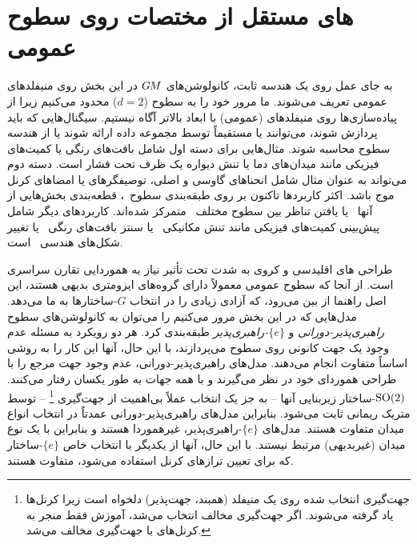 

\section{های مستقل از مختصات روی سطوح عمومی}
\label{sec:instantiations_mesh}


به جای عمل روی یک هندسه ثابت، کانولوشن‌های $G\mkern-1.4muM$ در این بخش روی منیفلدهای عمومی تعریف می‌شوند.
ما مرور خود را به سطوح ($d=2$) محدود می‌کنیم زیرا از پیاده‌سازی‌ها روی منیفلدهای (عمومی) با ابعاد بالاتر آگاه نیستیم.
سیگنال‌هایی که باید پردازش شوند، می‌توانند یا مستقیماً توسط مجموعه داده ارائه شوند یا از هندسه سطوح محاسبه شوند.
مثال‌هایی برای دسته اول شامل بافت‌های رنگی یا کمیت‌های فیزیکی مانند میدان‌های دما یا تنش دیواره یک ظرف تحت فشار است.
دسته دوم می‌تواند به عنوان مثال شامل انحناهای گاوسی و اصلی، توصیفگرهای  یا امضاهای کرنل موج باشد.
اکثر کاربردها تاکنون بر روی طبقه‌بندی سطوح~\cite{huang2019texturenet,jin2018learning,Wiersma2020}، قطعه‌بندی بخش‌هایی از آنها~\cite{poulenard2018multi,huang2019texturenet,Wiersma2020,Yang2020parallelFrameCNN} یا یافتن تناظر بین سطوح مختلف~\cite{masci2015geodesic,boscaini2016learning,schonsheck2018parallel,Wiersma2020,deHaan2020meshCNNs} متمرکز شده‌اند.
کاربردهای دیگر شامل پیش‌بینی کمیت‌های فیزیکی مانند تنش مکانیکی~\cite{sun2018zernet} یا سنتز بافت‌های رنگی~\cite{turk2001texture,ying2001texture} یا تغییر شکل‌های هندسی~\cite{hertz2020GeomTextureSynthesis} است.


طراحی های اقلیدسی و کروی به شدت تحت تأثیر نیاز به هموردایی تقارن سراسری است.
از آنجا که سطوح عمومی معمولاً دارای گروه‌های ایزومتری بدیهی هستند، این اصل راهنما از بین می‌رود، که آزادی زیادی را در انتخاب $G$-ساختارها به ما می‌دهد.
مدل‌هایی که در این بخش مرور می‌کنیم را می‌توان به کانولوشن‌های سطوح \emph{راهبری‌پذیر-دورانی} و \emph{$\{e\}$-راهبری‌پذیر} طبقه‌بندی کرد.
هر دو رویکرد به مسئله عدم وجود یک جهت کانونی روی سطوح می‌پردازند، با این حال، آنها این کار را به روشی اساساً متفاوت انجام می‌دهند.
مدل‌های راهبری‌پذیر-دورانی، عدم وجود جهت مرجع را با طراحی هموردای خود در نظر می‌گیرند و با همه جهات به طور یکسان رفتار می‌کنند.
$\operatorname{SO}(2)$-ساختار زیربنایی آنها -- به جز یک انتخاب عملاً بی‌اهمیت از جهت‌گیری%
\footnote{
	جهت‌گیری انتخاب شده روی یک منیفلد (همبند، جهت‌پذیر) دلخواه است زیرا کرنل‌ها یاد گرفته می‌شوند.
	اگر جهت‌گیری مخالف انتخاب می‌شد، آموزش فقط منجر به کرنل‌های با جهت‌گیری مخالف می‌شد.
}
-- توسط متریک ریمانی ثابت می‌شود.
بنابراین مدل‌های راهبری‌پذیر-دورانی عمدتاً در انتخاب انواع میدان متفاوت هستند.
مدل‌های $\{e\}$-راهبری‌پذیر، غیرهموردا هستند و بنابراین با یک نوع میدان (غیربدیهی) مرتبط نیستند.
با این حال، آنها از یکدیگر با انتخاب خاص $\{e\}$-ساختار که برای تعیین ترازهای کرنل استفاده می‌شود، متفاوت هستند.


